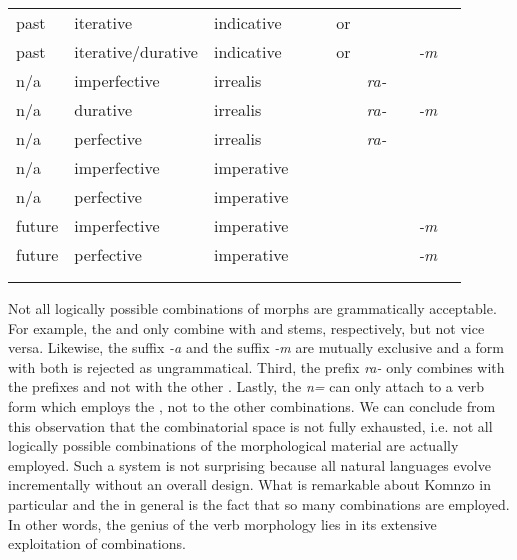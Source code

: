 \begin{sidewaystable}
\begin{tabularx}{\textwidth}{lllc|c|c|c|c|c|c|}
	past&iterative&indicative&\multicolumn{1}{c}{}&&\Betaone{} or \Betatwo&&\Rs&\multicolumn{2}{c}{}\\\cline{6-6}\cline{8-9}
	past&iterative/durative&indicative&\multicolumn{1}{c}{}&&\Betaone{} or \Betatwo&&\Rs&\emph{-m}&\multicolumn{1}{c}{}\\\cline{6-9}
	n/a&imperfective&irrealis&\multicolumn{1}{c}{}&&\Bet&\emph{ra-}&\Ext&\multicolumn{2}{c}{}\\\cline{6-9}
	n/a&durative&irrealis&\multicolumn{1}{c}{}&&\Bet&\emph{ra-}&\Ext&\emph{-m}&\multicolumn{1}{c}{}\\\cline{6-9}
	n/a&perfective&irrealis&\multicolumn{1}{c}{}&&\Bet&\emph{ra-}&\Rs&\multicolumn{2}{c}{}\\\cline{6-8}\cline{10-10}
	n/a&imperfective&imperative&\multicolumn{1}{c}{}&&\Bet&&\Ext&\multicolumn{1}{c|}{}&{\Imp}\\\cline{6-6}\cline{8-8}\cline{10-10}
	n/a&perfective&imperative&\multicolumn{1}{c}{}&&\Bet&&\Rs&\multicolumn{1}{c|}{}&{\Imp}\\\cline{6-6}\cline{8-10}
	future&imperfective&imperative&\multicolumn{1}{c}{}&&\Bet&&\Ext&\emph{-m}&{\Imp}\\\cline{6-6}\cline{8-10}
	future&perfective&imperative&\multicolumn{1}{c}{}&&\Bet&&\Rs&\emph{-m}&{\Imp}\\\cline{6-6}\cline{8-10}
	\multicolumn{9}{c}{}\\
	\lspbottomrule
\end{tabularx}
\end{sidewaystable} 

Not all logically possible combinations of morphs are grammatically acceptable. For example, the \Alph{} and \Gam{}  only combine with {\Ext} and {\Rs} stems, respectively, but not vice versa. Likewise, the  suffix \emph{-a} and the  suffix \emph{-m} are mutually exclusive and a  form with both is rejected as ungrammatical. Third, the  prefix \emph{ra-} only combines with the \Bet{} prefixes and not with the other . Lastly, the   \emph{n=} can only attach to a verb form which employs the \Alph{} , not to the other combinations. We can conclude from this observation that the combinatorial space is not fully exhausted, i.e. not all logically possible combinations of the morphological material are actually employed. Such a system is not surprising because all natural languages evolve incrementally without an overall design. What is remarkable about Komnzo in particular and the  in general is the fact that so many combinations are employed. In other words, the genius of the verb morphology lies in its extensive exploitation of combinations.

